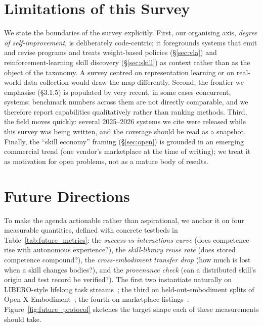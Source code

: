 \PassOptionsToPackage{svgnames,dvipsnames}{xcolor} \documentclass[acmsmall,screen,nonacm]{acmart}
\begin{document}
 \section{Limitations of this Survey}
\label{sec:limitations}

We state the boundaries of the survey explicitly. First, our organising axis, \emph{degree
of self-improvement}, is deliberately code-centric; it foregrounds systems that emit and
revise programs and treats weight-based policies (\S\ref{sec:vla}) and reinforcement-learning
skill discovery (\S\ref{sec:skill}) as context rather than as the object of the taxonomy.
A survey centred on representation learning or on real-world data collection would draw the
map differently. Second, the frontier we emphasise (\S3.1.5) is populated by very recent,
in some cases concurrent, systems; benchmark numbers across them are not directly
comparable, and we therefore report capabilities qualitatively rather than ranking methods.
Third, the field moves quickly: several 2025--2026 systems we cite were released while this
survey was being written, and the coverage should be read as a snapshot. Finally, the
``skill economy'' framing (\S\ref{sec:open}) is grounded in an emerging commercial trend
(one vendor's marketplace at the time of writing); we treat it as motivation for open
problems, not as a mature body of results.
 \section{Future Directions}
\label{sec:future}

To make the agenda actionable rather than aspirational, we anchor it on four measurable
quantities, defined with concrete testbeds in Table~\ref{tab:future_metrics}: the
\emph{success-vs-interactions curve} (does competence rise with autonomous experience?), the
\emph{skill-library reuse rate} (does stored competence compound?), the \emph{cross-embodiment
transfer drop} (how much is lost when a skill changes bodies?), and the \emph{provenance check}
(can a distributed skill's origin and test record be verified?). The first two instantiate
naturally on LIBERO-style lifelong task streams~\citep{libero}; the third on held-out-embodiment
splits of Open X-Embodiment~\citep{openx}; the fourth on marketplace
listings~\citep{unistore2026}. Figure~\ref{fig:future_protocol} sketches the target shape each of
these measurements should take.
\end{document}
